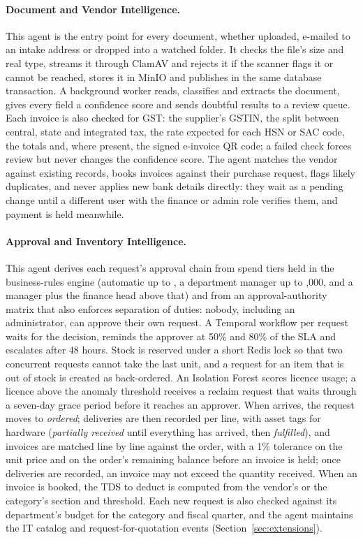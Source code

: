 \paragraph{Document and Vendor Intelligence.} This agent is the entry point for every document, whether uploaded, e-mailed to an intake address or dropped into a watched folder. It checks the file's size and real type, streams it through ClamAV and rejects it if the scanner flags it or cannot be reached, stores it in MinIO and publishes  in the same database transaction. A background worker reads, classifies and extracts the document, gives every field a confidence score and sends doubtful results to a review queue. Each invoice is also checked for GST: the supplier's GSTIN, the split between central, state and integrated tax, the rate expected for each HSN or SAC code, the totals and, where present, the signed e-invoice QR code; a failed check forces review but never changes the confidence score. The agent matches the vendor against existing records, books invoices against their purchase request, flags likely duplicates, and never applies new bank details directly: they wait as a pending change until a different user with the finance or admin role verifies them, and payment is held meanwhile.

\paragraph{Approval and Inventory Intelligence.} This agent derives each request's approval chain from spend tiers held in the business-rules engine (automatic up to , a department manager up to ,000, and a manager plus the finance head above that) and from an approval-authority matrix that also enforces separation of duties: nobody, including an administrator, can approve their own request. A Temporal workflow per request waits for the decision, reminds the approver at 50\% and 80\% of the SLA and escalates after 48 hours. Stock is reserved under a short Redis lock so that two concurrent requests cannot take the last unit, and a request for an item that is out of stock is created as back-ordered. An Isolation Forest scores licence usage; a licence above the anomaly threshold receives a reclaim request that waits through a seven-day grace period before it reaches an approver. When  arrives, the request moves to \emph{ordered}; deliveries are then recorded per line, with asset tags for hardware (\emph{partially received} until everything has arrived, then \emph{fulfilled}), and invoices are matched line by line against the order, with a 1\% tolerance on the unit price and on the order's remaining balance before an invoice is held; once deliveries are recorded, an invoice may not exceed the quantity received. When an invoice is booked, the TDS to deduct is computed from the vendor's or the category's section and threshold. Each new request is also checked against its department's budget for the category and fiscal quarter, and the agent maintains the IT catalog and request-for-quotation events (Section~\ref{sec:extensions}).

